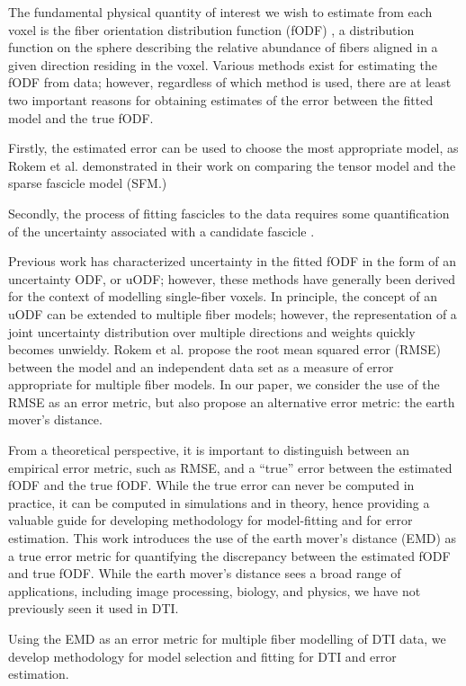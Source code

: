 \documentclass[11pt]{article}
\begin{document}
The fundamental physical quantity of interest we wish to estimate from
each voxel is the fiber orientation distribution function (fODF)
\cite{Behrens2009}, a distribution function on the sphere describing
the relative abundance of fibers aligned in a given direction residing
in the voxel.
Various methods exist for estimating the fODF from data;
however, regardless of which method is used, there are at least two
important reasons for obtaining estimates of the error between the
fitted model and the true fODF.

Firstly, the estimated error can be used to choose the most
appropriate model, as Rokem et al. \cite{Rokem2013} demonstrated in
their work on comparing the tensor model and the sparse fascicle model (SFM.)

Secondly, the process of fitting fascicles to the data requires some
quantification of the uncertainty associated with a candidate fascicle
\cite{Behrens2009}\cite{Pestilli2013}.

Previous work has characterized uncertainty in the fitted fODF in the
form of an uncertainty ODF, or uODF\cite{Behrens2009}; however, these
methods have generally been derived for the context of modelling
single-fiber voxels.
In principle, the concept of an uODF can be extended to multiple fiber
models; however, the representation of a joint uncertainty
distribution over multiple directions and weights quickly becomes
unwieldy.
Rokem et al. \cite{Rokem2013} propose the root mean squared
error (RMSE) between the model and an independent data set as a
measure of error appropriate for multiple fiber models.
In our paper, we consider the use of the RMSE as an error metric, but
also propose an alternative error metric: the earth mover's distance.

From a theoretical perspective, it is important to distinguish between
an empirical error metric, such as RMSE, and a ``true'' error between
the estimated fODF and the true fODF.
While the true error can never be computed in practice,
it can be computed in simulations and in theory,
hence providing a valuable guide for developing methodology for
model-fitting and for error estimation.
This work introduces the use of the earth mover's distance (EMD) as a true error
metric for quantifying the discrepancy between the estimated fODF and
true fODF.
While the earth mover's distance sees a broad range of applications,
including image processing, biology, and physics,
we have not previously seen it used in DTI.

Using the EMD as an error metric for multiple fiber modelling of DTI
data, we develop methodology for model selection and fitting for DTI and error
estimation.
\end{document}
